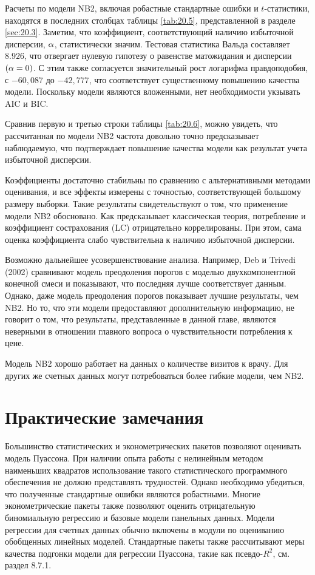 Расчеты по модели NB2, включая робастные стандартные ошибки и $t$-статистики, находятся в последних столбцах таблицы \ref{tab:20.5}, представленной в разделе \ref{sec:20.3}. Заметим, что коэффициент, соответствующий наличию избыточной дисперсии, $\alpha$, статистически значим.
Тестовая статистика Вальда составляет $8.926$, что отвергает нулевую гипотезу о равенстве матожидания и дисперсии $(\alpha = 0)$. С этим также согласуется значительный рост логарифма правдоподобия, с $-60,087$ до $-42,777$, что соответствует существенному повышению качества модели. Поскольку модели являются вложенными, нет необходимости укзывать AIC и BIC.

Сравнив первую и третью строки таблицы \ref{tab:20.6}, можно увидеть, что рассчитанная по модели NB2 частота довольно точно предсказывает наблюдаемую, что подтверждает повышение качества модели как результат учета избыточной дисперсии.

Коэффициенты достаточно стабильны по сравнению с альтернативными методами оценивания, и все эффекты измерены с точностью, соответствующей большому размеру выборки. Такие результаты свидетельствуют о том, что применение модели NB2 обосновано. Как предсказывает классическая теория, потребление и коэффициент сострахования (LC) отрицательно коррелированы. При этом, сама оценка коэффициента слабо чувствительна к наличию избыточной дисперсии.

Возможно дальнейшее усовершенствование анализа. Например, Deb и Trivedi (2002) сравнивают модель преодоления порогов с моделью двухкомпонентной конечной смеси и показывают, что последняя лучше соответствует данным. Однако, даже модель преодоления порогов показывает лучшие результаты, чем NB2. Но то, что эти модели предоставляют дополнительную информацию, не говорит о том, что результаты, представленные в данной главе, являются неверными в отношении главного вопроса о чувствительности потребления к цене.

Модель NB2 хорошо работает на данных о количестве визитов к врачу. Для других же счетных данных могут потребоваться более гибкие модели, чем NB2.




\section{Практические замечания}\label{sec:20.8}

\noindent
Большинство статистических и эконометрических пакетов позволяют оценивать модель Пуассона. При наличии опыта работы с нелинейным методом наименьших квадратов использование такого статистического программного обеспечения не должно представлять трудностей. Однако необходимо убедиться, что полученные стандартные ошибки являются робастными. Многие эконометрические пакеты также позволяют оценить отрицательную биномиальную регрессию и базовые модели панельных данных. Модели регрессии для счетных данных обычно включены в модули по оцениванию обобщенных линейных моделей. Стандартные пакеты также рассчитывают меры качества подгонки модели для регрессии Пуассона, такие как псевдо-$R^2$, см. раздел 8.7.1.

